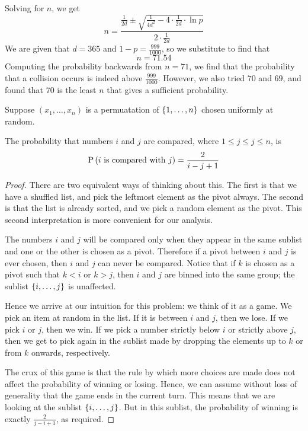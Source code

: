 \documentclass[11pt]{article}
\begin{document}
%
Solving for $n$, we get
%
\begin{equation*}
    n
    = \frac{
        \frac{1}{2d}
        \pm
        \sqrt{
            \frac{1}{4d^2} - 4 \cdot \frac{1}{2d} \cdot \ln p
        }
    }{
        2 \cdot \frac{1}{2d}
    }
\end{equation*}
%
We are given that $d = 365$ and $1 - p = \frac{999}{1000}$, so we substitute to
find that
%
\begin{equation*}
    n = 71.54
\end{equation*}
%
Computing the probability backwards from $n = 71$, we find that the probability
that a collision occurs is indeed above $\frac{999}{1000}$. However, we also
tried $70$ and $69$, and found that $70$ is the least $n$ that gives a
sufficient probability.


Suppose $(x_1,\ldots,x_n)$ is a permuatation of $\range{n}$ chosen uniformly at
random.

\begin{prop}
    The probability that numbers $i$ and $j$ are compared,
    where $1 \leq j \leq j \leq n$,
    is
    \begin{equation*}
        \P{\text{$i$ is compared with $j$}} = \frac{2}{i - j + 1}
    \end{equation*}
\end{prop}

\begin{proof}
    There are two equivalent ways of thinking about this.
    The first is that we have a shuffled list, and pick the leftmost element as
    the pivot always.
    The second is that the list is already sorted, and we pick a random element
    as the pivot.
    This second interpretation is more convenient for our analysis.

    The numbers $i$ and $j$ will be compared only when they appear in the same
    sublist and one or the other is chosen as a pivot.
    Therefore if a pivot between $i$ and $j$ is ever chosen, then $i$ and $j$
    can never be compared.
    Notice that if $k$ is chosen as a pivot such that $k < i$ or $k > j$,
    then $i$ and $j$ are binned into the same group; the sublist $\range[i]{j}$
    is unaffected.

    Hence we arrive at our intuition for this problem: we think of it as a
    game. We pick an item at random in the list. If it is between $i$ and $j$,
    then we lose. If we pick $i$ or $j$, then we win. If we pick a number
    strictly below $i$ or strictly above $j$, then we get to pick again in the
    sublist made by dropping the elements up to $k$ or from $k$ onwards,
    respectively.

    The crux of this game is that the rule by which more choices are made does
    not affect the probability of winning or losing. Hence, we can assume
    without loss of generality that the game ends in the current turn.
    This means that we are looking at the sublist $\range[i]{j}$.
    But in this sublist, the probability of winning is exactly
    $\frac{2}{j - i + 1}$,
    as required.
\end{proof}
\end{document}
